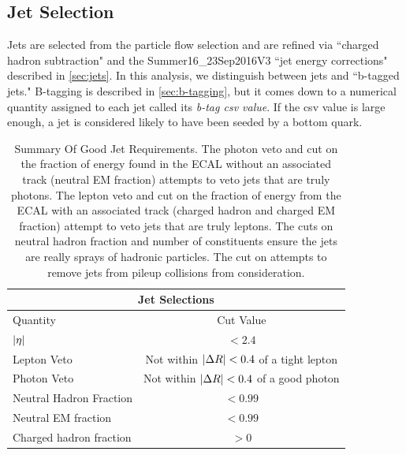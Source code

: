   \subsection{Jet Selection} \label{sec:jet_selection}

  Jets are selected from the particle flow selection and are refined via ``charged hadron subtraction" and the Summer16\_23Sep2016V3 ``jet energy corrections" described in \ref{sec:jets}. In this analysis, we distinguish between jets and ``b-tagged jets." B-tagging is described in \ref{sec:b-tagging}, but it comes down to a numerical quantity assigned to each jet called its \emph{b-tag csv value}. If the csv value is large enough, a jet is considered likely to have been seeded by a bottom quark. 

      \begin{table}[!h]
      \begin{center}
        \caption[Summary Of Good Jet Requirements.]{\label{table:muons} Summary Of Good Jet Requirements. The photon veto and cut on the fraction of energy found in the ECAL without an associated track (neutral EM fraction) attempts to veto jets that are truly photons. The lepton veto and cut on the fraction of energy from the ECAL with an associated track (charged hadron and charged EM fraction) attempt to veto jets that are truly leptons. The cuts on neutral hadron fraction and number of constituents ensure the jets are really sprays of hadronic particles. The cut on \pt attempts to remove jets from pileup collisions from consideration.}
        \begin{tabular}{l|c|c}
          \hline
          \hline
          \multicolumn{3}{c}{Jet Selections} \\
          \hline
          \hline
          Quantity                  & \multicolumn{2}{c}{ Cut Value } \\
          \hline
          $\lvert \eta \rvert$              & \multicolumn{2}{c}{$< 2.4$}   \\
          Lepton Veto               & \multicolumn{2}{c}{Not within $\lvert \Delta R \rvert < 0.4$ of a tight lepton} \\
          Photon Veto               & \multicolumn{2}{c}{Not within $\lvert \Delta R \rvert < 0.4$ of a good photon } \\
          Neutral Hadron Fraction   & \multicolumn{2}{c}{ $< 0.99$} \\
          Neutral EM fraction       & \multicolumn{2}{c}{ $< 0.99$} \\
          Charged hadron fraction   & \multicolumn{2}{c}{ $> 0   $} \\

\end{tabular}
\end{center}
\end{table}
